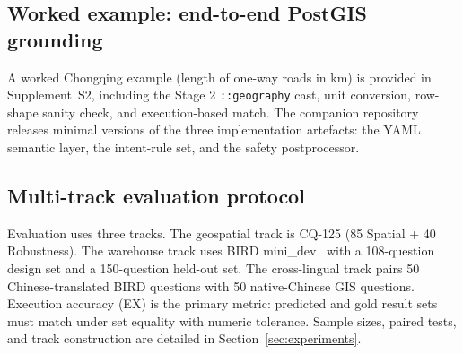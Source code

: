 \subsection{Worked example: end-to-end PostGIS grounding}
\label{sec:worked-example}

A worked Chongqing example (length of one-way roads in km) is provided in Supplement~S2, including the Stage 2 \texttt{::geography} cast, unit conversion, row-shape sanity check, and execution-based match. The companion repository releases minimal versions of the three implementation artefacts: the YAML semantic layer, the intent-rule set, and the safety postprocessor.

\subsection{Multi-track evaluation protocol}

Evaluation uses three tracks. The geospatial track is CQ-125 (85 Spatial + 40 Robustness). The warehouse track uses BIRD mini\_dev~\citep{li2023bird} with a 108-question design set and a 150-question held-out set. The cross-lingual track pairs 50 Chinese-translated BIRD questions with 50 native-Chinese GIS questions. Execution accuracy (EX) is the primary metric: predicted and gold result sets must match under set equality with numeric tolerance. Sample sizes, paired tests, and track construction are detailed in Section~\ref{sec:experiments}.

